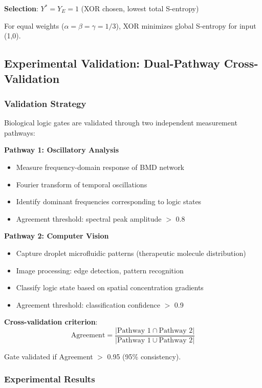 \documentclass[11pt,a4paper]{article}
\begin{document}
\textbf{Selection}: $Y^* = Y_E = 1$ (XOR chosen, lowest total S-entropy)

For equal weights ($\alpha = \beta = \gamma = 1/3$), XOR minimizes global S-entropy for input (1,0).

\subsection{Experimental Validation: Dual-Pathway Cross-Validation}

\subsubsection{Validation Strategy}

Biological logic gates are validated through two independent measurement pathways\cite{sachikonye2024grand}:

\textbf{Pathway 1: Oscillatory Analysis}
\begin{itemize}
\item Measure frequency-domain response of BMD network
\item Fourier transform of temporal oscillations
\item Identify dominant frequencies corresponding to logic states
\item Agreement threshold: spectral peak amplitude $>$ 0.8
\end{itemize}

\textbf{Pathway 2: Computer Vision}
\begin{itemize}
\item Capture droplet microfluidic patterns (therapeutic molecule distribution)
\item Image processing: edge detection, pattern recognition
\item Classify logic state based on spatial concentration gradients
\item Agreement threshold: classification confidence $>$ 0.9
\end{itemize}

\textbf{Cross-validation criterion}:
\begin{equation}
\text{Agreement} = \frac{|\text{Pathway 1} \cap \text{Pathway 2}|}{|\text{Pathway 1} \cup \text{Pathway 2}|}
\end{equation}

Gate validated if Agreement $>$ 0.95 (95\% consistency).

\subsubsection{Experimental Results}
\end{document}

